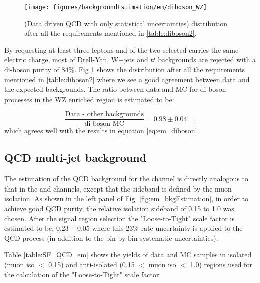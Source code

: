 \begin{figure}\centering
  \texttt{[image: figures/backgroundEstimation/em/diboson\_WZ]}
  \caption{\label{fig:diBoson2} (Data driven QCD with only statistical uncertainties) 
\meffemu distribution after all the requirements mentioned in \ref{table:diboson2}.}
\end{figure}

By requesting at least three leptons and of the two selected carries the 
same electric charge, most of Drell-Yan, W+jets and $t\bar{t}$ backgrounds 
are rejected with a di-boson purity of 84\%. Fig \ref{fig:diBoson2} shows 
the \meffemu distribution after all the requirements mentioned in 
\ref{table:diboson2} where we see a good agreement between data and 
the expected backgrounds. The ratio between data and MC for di-boson 
processes in the WZ enriched region is estimated to be:

\begin{equation}
\frac{\text{Data - other backgrounds}}{\text{di-boson MC}} = 0.98 \pm 0.04 \quad.
\end{equation}
which agrees well with the results in equation \ref{eq:em_diboson}.

\subsection{QCD multi-jet background}\label{sec:em_qcd}
The estimation of the QCD background for the \tetm channel is directly
analogous to that in the \teth and \tmth channels, except that the 
sideband is defined by the muon isolation.  As shown in the left panel 
of Fig. \ref{fig:em_bkgEstimation}, in order to achieve good QCD purity, 
the relative isolation sideband of 0.15 to 1.0 was chosen. After the
signal region selection the "Loose-to-Tight" scale factor is estimated
to be: $0.23 \pm 0.05$ where this 23\% rate uncertainty is applied to
the QCD process (in addition to the bin-by-bin systematic
uncertainties).

Table \ref{table:SF_QCD_em} shows the yields of data and MC samples in 
isolated (muon iso $<$ 0.15) and anti-isolated (0.15 $<$ muon iso $<$ 1.0) 
regions used for the calculation of the "Loose-to-Tight" scale factor.

